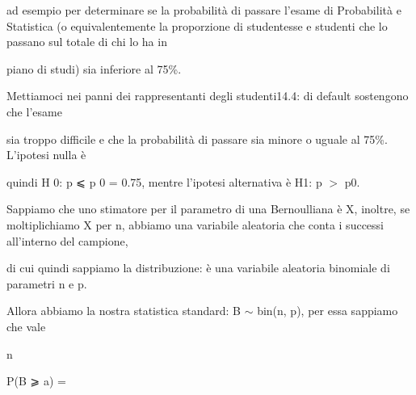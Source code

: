 \documentclass[a4paper,portrait,12pt]{article}
\begin{document}
\begin{flushleft}
ad esempio per determinare se la probabilit\`{a} di passare l'esame di Probabilit\`{a} e Statistica (o equivalentemente la proporzione di studentesse e studenti che lo passano sul totale di chi lo ha in
\end{flushleft}


\begin{flushleft}
piano di studi) sia inferiore al 75\%.
\end{flushleft}


\begin{flushleft}
Mettiamoci nei panni dei rappresentanti degli studenti14.4: di default sostengono che l'esame
\end{flushleft}


\begin{flushleft}
sia troppo difficile e che la probabilit\`{a} di passare sia minore o uguale al 75\%. L'ipotesi nulla \`{e}
\end{flushleft}


\begin{flushleft}
quindi H 0: p ⩽ p 0 = 0.75, mentre l'ipotesi alternativa \`{e} H1: p $>$ p0.
\end{flushleft}


\begin{flushleft}
Sappiamo che uno stimatore per il parametro di una Bernoulliana \`{e} X, inoltre, se moltiplichiamo X per n, abbiamo una variabile aleatoria che conta i successi all'interno del campione,
\end{flushleft}


\begin{flushleft}
di cui quindi sappiamo la distribuzione: \`{e} una variabile aleatoria binomiale di parametri n e p.
\end{flushleft}


\begin{flushleft}
Allora abbiamo la nostra statistica standard: B $\sim$ bin(n, p), per essa sappiamo che vale
\end{flushleft}


\begin{flushleft}
n
\end{flushleft}





\begin{flushleft}
P(B ⩾ a) =
\end{flushleft}
\end{document}
